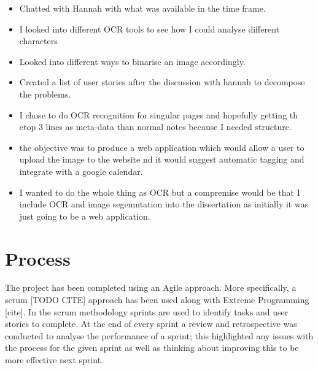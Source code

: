 
\begin{itemize}
  \item Chatted with Hannah with what was available in the time frame.
  \item I looked into different OCR tools to see how I could analyse different characters
  \item Looked into different ways to binarise an image accordingly.
  \item Created a list of user stories after the discussion with hannah to decompose the problems.
  \item I chose to do OCR recognition for singular pages and hopefully getting th etop 3 lines as meta-data than normal notes because I needed structure.
  \item the objective was to produce a web application which would allow a user to upload the image to the website nd it would suggest automatic tagging and integrate with a google calendar.
  \item I wanted to do the whole thing as OCR but a compremise would be that I include OCR and image segemntation into the dissertation as initially it was just going to be a web application.
\end{itemize}

\section{Process}
The project has been completed using an Agile approach. More specifically, a scrum [TODO CITE] approach has been used along with Extreme Programming [cite]. In the scrum methodology sprints are used to identify tasks and user stories to complete. At the end of every sprint a review and retrospective was conducted to analyse the performance of a sprint; this highlighted any issues with the process for the given sprint as well as thinking about improving this to be more effective next sprint.


